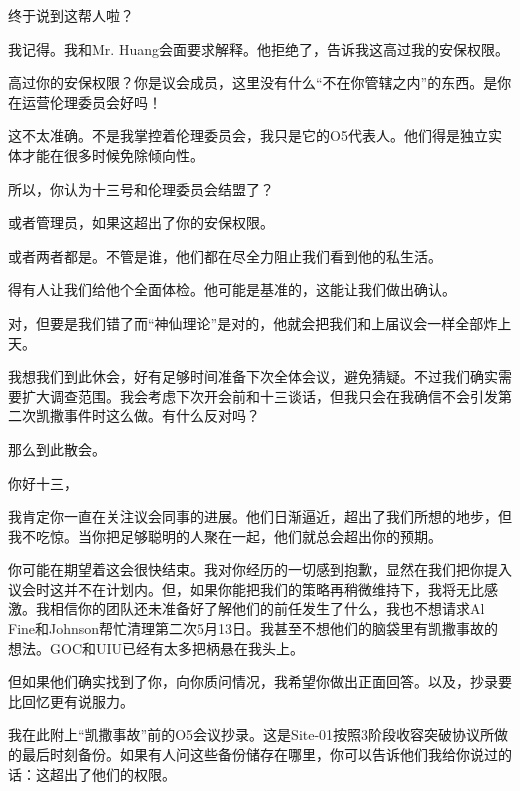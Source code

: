 \begin{scpbox}
终于说到这帮人啦？

我记得。我和Mr. Huang会面要求解释。他拒绝了，告诉我这高过我的安保权限。

高过你的安保权限？你是议会成员，这里没有什么“不在你管辖之内”的东西。是你在运营伦理委员会好吗！

这不太准确。不是我掌控着伦理委员会，我只是它的O5代表人。他们得是独立实体才能在很多时候免除倾向性。

所以，你认为十三号和伦理委员会结盟了？

或者管理员，如果这超出了你的安保权限。

或者两者都是。不管是谁，他们都在尽全力阻止我们看到他的私生活。

得有人让我们给他个全面体检。他可能是基准的，这能让我们做出确认。

对，但要是我们错了而“神仙理论”是对的，他就会把我们和上届议会一样全部炸上天。

我想我们到此休会，好有足够时间准备下次全体会议，避免猜疑。不过我们确实需要扩大调查范围。我会考虑下次开会前和十三谈话，但我只会在我确信不会引发第二次凯撒事件时这么做。有什么反对吗？


那么到此散会。

\end{scpbox}




\begin{whiteboxbb}


你好十三，

我肯定你一直在关注议会同事的进展。他们日渐逼近，超出了我们所想的地步，但我不吃惊。当你把足够聪明的人聚在一起，他们就总会超出你的预期。

你可能在期望着这会很快结束。我对你经历的一切感到抱歉，显然在我们把你提入议会时这并不在计划内。但，如果你能把我们的策略再稍微维持下，我将无比感激。我相信你的团队还未准备好了解他们的前任发生了什么，我也不想请求Al
 Fine和Johnson帮忙清理第二次5月13日。我甚至不想他们的脑袋里有凯撒事故的想法。GOC和UIU已经有太多把柄悬在我头上。

但如果他们确实找到了你，向你质问情况，我希望你做出正面回答。以及，抄录要比回忆更有说服力。

我在此附上“凯撒事故”前的O5会议抄录。这是Site-01按照3阶段收容突破协议所做的最后时刻备份。如果有人问这些备份储存在哪里，你可以告诉他们我给你说过的话：这超出了他们的权限。


\end{whiteboxbb}


